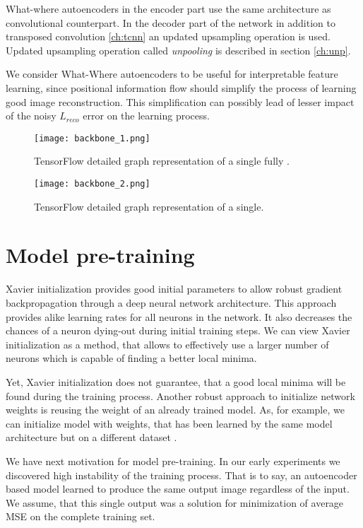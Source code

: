 What-where autoencoders in the encoder part use the same architecture as convolutional counterpart.
In the decoder part of the network in addition to transposed convolution \ref{ch:tcnn} an updated upsampling operation is used. Updated upsampling operation called \textit{unpooling} is described in section \ref{ch:unp}.

We consider What-Where autoencoders to be useful for interpretable feature learning, since positional information flow should simplify the process of learning good image reconstruction. This simplification can possibly lead of lesser impact of the noisy $L_{reco}$ error on the learning process.

\begin{figure}[H]
  \centering
  \texttt{[image: backbone\_1.png]}
  \caption{TensorFlow detailed graph representation of a single fully .}
  \label{fig:tf_graph_1}
\end{figure}
\begin{figure}[H]
  \centering
    \texttt{[image: backbone\_2.png]}
  \caption{TensorFlow detailed graph representation of a single.}
  \label{fig:tf_graph_2}
\end{figure}

\section{Model pre-training}

Xavier initialization provides good initial parameters to allow robust gradient backpropagation through a deep neural network architecture.
This approach provides alike learning rates for all neurons in the network.
It also decreases the chances of a neuron dying-out during initial training steps.
We can view Xavier initialization as a method, that allows to effectively use a larger number of neurons which is capable of finding a better local minima.

Yet, Xavier initialization does not guarantee, that a good local minima will be found during the training process.
Another robust approach to initialize network weights is reusing the weight of an already trained model.
As, for example, we can initialize model with weights, that has been learned by the same model architecture but on a different dataset \cite{Yosinski2014}.

We have next motivation for model pre-training.
In our early experiments we discovered high instability of the training process.
That is to say, an autoencoder based model learned to produce the same output image regardless of the input.
We assume, that this single output was a solution for minimization of average MSE on the complete training set.


